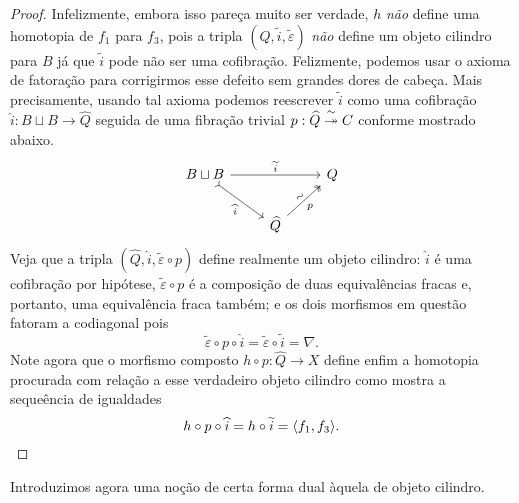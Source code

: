 \begin{proof}
  Infelizmente, embora isso pareça muito ser verdade, $h$ \emph{não} define uma homotopia de $f_{1}$ para $f_{3}$, pois a tripla $(Q,\widetilde{i},\widetilde{\varepsilon})$ \emph{não} define um objeto cilindro para $B$ já que $\widetilde{i}$ pode não ser uma cofibração.
  Felizmente, podemos usar o axioma de fatoração para corrigirmos esse defeito sem grandes dores de cabeça.
  Mais precisamente, usando tal axioma podemos reescrever $\widetilde{i}$ como uma cofibração $\widehat{i}: B \sqcup B \to \widehat{Q}$ seguida de uma fibração trivial $p: \widehat{Q} \overset{\sim}{\twoheadrightarrow} C$ conforme mostrado abaixo.
  \begin{displaymath}
    \begin{tikzcd}
      B \sqcup B
      \arrow[rr, "\widetilde{i}"]
      \arrow[rd, tail, "\widehat{i}" swap]
      & & Q
      \\ & \widehat{Q}
      \arrow[ru, two heads, "\sim" {sloped}, "p" {swap}]
    \end{tikzcd}
  \end{displaymath}
  Veja que a tripla $(\widehat{Q},\widehat{i},\widetilde{\varepsilon} \circ p)$ define realmente um objeto cilindro: $\widehat{i}$ é uma cofibração por hipótese, $\widetilde{\varepsilon} \circ p$ é a composição de duas equivalências fracas e, portanto, uma equivalência fraca também; e os dois morfismos em questão fatoram a codiagonal pois
  \begin{displaymath}
    \widetilde{\varepsilon} \circ p \circ \widehat{i} = \widetilde{\varepsilon} \circ \widetilde{i} = \nabla.
  \end{displaymath}
  Note agora que o morfismo composto $h \circ p: \widehat{Q} \to X$ define enfim a homotopia procurada com relação a esse verdadeiro objeto cilindro como mostra a sequeência de igualdades
  \begin{displaymath}
    h \circ p \circ \widehat{i} = h \circ \widetilde{i} = \langle f_{1},f_{3} \rangle. \qedhere
  \end{displaymath}
\end{proof}

Introduzimos agora uma noção de certa forma dual àquela de objeto cilindro.

